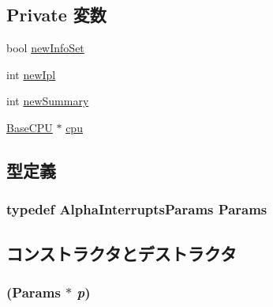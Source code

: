 \subsection*{Private 変数}
\begin{DoxyCompactItemize}
\item 
bool \hyperlink{classAlphaISA_1_1Interrupts_af2d03360eddc7a37308f528ec004d1aa}{newInfoSet}
\item 
int \hyperlink{classAlphaISA_1_1Interrupts_a1de149de9a59d4b8291c2aa655119825}{newIpl}
\item 
int \hyperlink{classAlphaISA_1_1Interrupts_ad13b7544dc5de8549f52b32df52e0d72}{newSummary}
\item 
\hyperlink{classBaseCPU}{BaseCPU} $\ast$ \hyperlink{classAlphaISA_1_1Interrupts_a7a31ca9fefb2fe821f29a270678912db}{cpu}
\end{DoxyCompactItemize}


\subsection{型定義}
\hypertarget{classAlphaISA_1_1Interrupts_acac734c7c124173e3940e672404775c6}{
\subsubsection[{Params}]{\setlength{\rightskip}{0pt plus 5cm}typedef AlphaInterruptsParams {\bf Params}}}
\label{classAlphaISA_1_1Interrupts_acac734c7c124173e3940e672404775c6}


\subsection{コンストラクタとデストラクタ}
\hypertarget{classAlphaISA_1_1Interrupts_a3d148759405b99148e0c34750966edb1}{
\subsubsection[{Interrupts}]{ ({\bf Params} $\ast$ {\em p})}}
\label{classAlphaISA_1_1Interrupts_a3d148759405b99148e0c34750966edb1}



